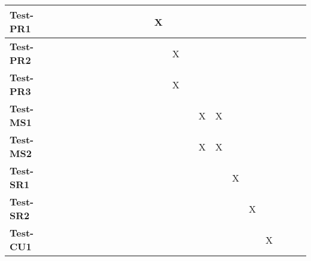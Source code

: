 \documentclass[12pt, titlepage]{article}
\begin{document}
\begin{landscape}
\begin{table}[H]
\begin{adjustwidth}{-0.3in}{-0.5in}
{\begin{tabular}{c|c|c|c|c|c|c|c|c|c|c|c|c|c|c|c|c|c|c|c|c|c|}
\multicolumn{1}{|l|}{\textbf{Test-PR1}}   &             &             &              &             &             &             &             &             &              &              &      X        &              &             &             &             &       & &&&&      \\ \hline
\multicolumn{1}{|l|}{\textbf{Test-PR2}}   &              &              &              &              &              &             &             &             &             &             &             &    X         &              &              &            &      &   &&&&     \\ \hline
\multicolumn{1}{|l|}{\textbf{Test-PR3}}   &             &             &              &             &             &             &            &             &              &              &              &      X        &             &             &             &     &   &&&&      \\ \hline
\multicolumn{1}{|l|}{\textbf{Test-MS1}}   &             &             &             &             &             &              &             &             &              &              &              &             &              &      X       &      X      &         &&&&&     \\ \hline
\multicolumn{1}{|l|}{\textbf{Test-MS2}}   &             &             &             &             &             &              &             &             &              &              &              &             &              &       X      &       X      &         &&&&&     \\ \hline
\multicolumn{1}{|l|}{\textbf{Test-SR1}}   &             &             &             &             &             &              &             &             &              &              &              &             &              &             &             &    X     &&&&&     \\ \hline
\multicolumn{1}{|l|}{\textbf{Test-SR2}}   &             &             &             &             &             &              &             &             &              &              &              &             &              &             &             &         &X&&&&     \\ \hline
\multicolumn{1}{|l|}{\textbf{Test-CU1}}   &             &             &             &             &             &              &             &             &              &              &              &             &              &             &             &         &&X&&&     \\ \hline

\end{tabular}}
\end{adjustwidth}
\end{table}
\end{landscape}
\end{document}
